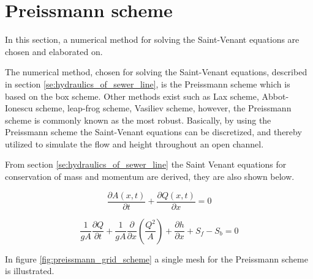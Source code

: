 ﻿\section{Preissmann scheme}\label{se:preissmann_scheme}
In this section, a numerical method for solving the Saint-Venant equations are chosen and elaborated on.


The numerical method, chosen for solving the Saint-Venant equations, described in section \ref{se:hydraulics_of_sewer_line}, is the Preissmann scheme which is based on the box scheme. Other methods exist such as Lax scheme, Abbot-Ionescu scheme, leap-frog scheme, Vasiliev scheme, however, the Preissmann scheme is commonly known as the most robust. Basically, by using the Preissmann scheme the Saint-Venant equations can be discretized, and thereby utilized to simulate the flow and height throughout an open channel.

From section \ref{se:hydraulics_of_sewer_line} the Saint Venant equations for conservation of mass and momentum are derived, they are also shown below.

\begin{equation}\label{eq:saintbernard_mass_preiss}
\frac{\partial A(x,t)}{\partial t} + \frac{\partial Q(x,t)}{\partial x}=0
\end{equation}

\begin{equation}\label{eq:saintbernard_momentum_preiss}
\frac{1}{gA} \frac{\partial Q}{\partial t} +\frac{1}{gA}\frac{\partial}{\partial x} \left( \frac{Q^2}{A} \right) + \frac{\partial h}{\partial x} + S_f - S_b = 0
\end{equation}


In figure \ref{fig:preissmann_grid_scheme} a single mesh for the Preissmann scheme is illustrated.

